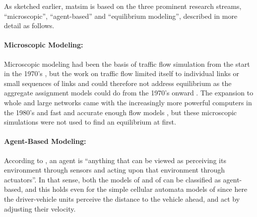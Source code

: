 As sketched earlier, \gls{matsim} is based on the three prominent research streams, ``microscopic'', ``agent-based'' and ``equilibrium modeling'', described in more detail as follows.

\paragraph{Microscopic Modeling:} 
Microscopic modeling had been the basis of traffic flow simulation from the start in the 1970’s \citep[e.g.,][]{Wiedemann_PhDThesis_1974, Seddon_Simulation_1972}, but the work on traffic flow limited itself to individual links or small sequences of links and could therefore not address equilibrium as the aggregate assignment models could do from the 1970’s onward \citep[see][]{OrtuzarWillumsen_2011}. The expansion to whole and large networks came with the increasingly more powerful computers in the 1980’s and fast and accurate enough flow models \citep[e.g.,][]{Schwerdtfeger_VolmulerHamerslag_1984,NagelSchreckenberg1992CA,Daganzo_TransResPartB_1994}, but these 
microscopic simulations were not used to find an \gls{equilibrium} at first. 

\paragraph{Agent-Based Modeling:} 
According to \citet[][p.~53]{RusselNorvig2010ArtificialIntelligence}, an \gls{agent} is ``anything that can be viewed as perceiving its environment through sensors and acting upon that environment through actuators''. In that sense, both the models of \citet{Seddon_Simulation_1972} and of \citet{Wiedemann_PhDThesis_1974} can be classified as agent-based, and this holds even for the simple cellular automata models of \citet{NagelSchreckenberg1992CA} since here the driver-vehicle units perceive the distance to the vehicle ahead, and act by adjusting their velocity.  

